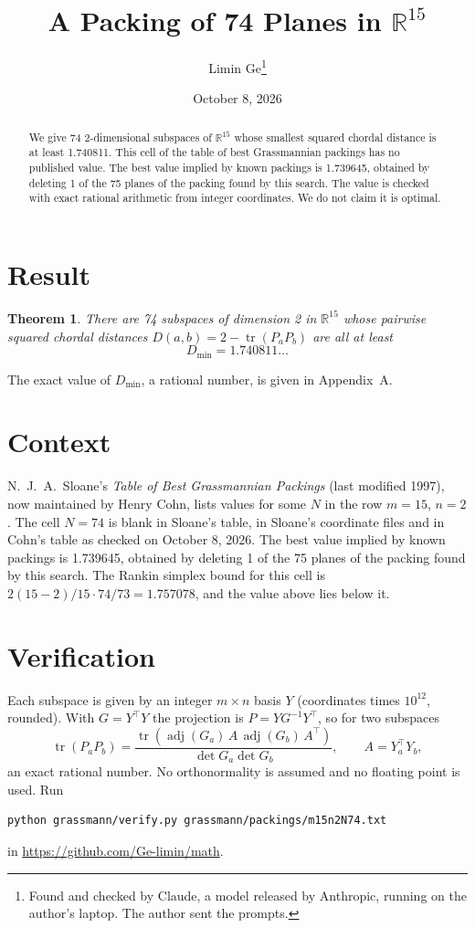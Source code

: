 \documentclass[11pt,a4paper]{article}
\title{A Packing of 74 Planes in $\mathbb{R}^{15}$}
\author{Limin Ge\thanks{Found and checked by Claude, a model released by Anthropic, running on the author's laptop. The author sent the prompts.}}
\date{October 8, 2026}
\newtheorem*{theorem}{Theorem}
\begin{document}
\maketitle
\begin{abstract}
We give 74 2-dimensional subspaces of $\mathbb{R}^{15}$ whose smallest squared chordal distance is at least 1.740811. This cell of the table of best Grassmannian packings has no published value. The best value implied by known packings is 1.739645, obtained by deleting 1 of the 75 planes of the packing found by this search. The value is checked with exact rational arithmetic from integer coordinates. We do not claim it is optimal.
\end{abstract}

\section{Result}
\begin{theorem}
There are 74 subspaces of dimension 2 in $\mathbb{R}^{15}$ whose pairwise squared chordal distances $D(a,b) = 2 - \operatorname{tr}(P_aP_b)$ are all at least
\[ D_{\min} = 1.740811\ldots \]
\end{theorem}
The exact value of $D_{\min}$, a rational number, is given in Appendix~A.


\section{Context}
N.~J.~A.~Sloane's \emph{Table of Best Grassmannian Packings} (last modified 1997), now maintained by Henry Cohn, lists values for some $N$ in the row $m=15$, $n=2$. The cell $N=74$ is blank in Sloane's table, in Sloane's coordinate files and in Cohn's table as checked on October 8, 2026. The best value implied by known packings is 1.739645, obtained by deleting 1 of the 75 planes of the packing found by this search. The Rankin simplex bound for this cell is $2(15-2)/15\cdot 74/73 = 1.757078$, and the value above lies below it.


\section{Verification}
Each subspace is given by an integer $m\times n$ basis $Y$ (coordinates times $10^{12}$, rounded). With $G=Y^\top Y$ the projection is $P=YG^{-1}Y^\top$, so for two subspaces
\[ \operatorname{tr}(P_aP_b)=\frac{\operatorname{tr}(\operatorname{adj}(G_a)\,A\,\operatorname{adj}(G_b)\,A^\top)}{\det G_a\det G_b},\qquad A=Y_a^\top Y_b, \]
an exact rational number. No orthonormality is assumed and no floating point is used. Run
\begin{verbatim}
python grassmann/verify.py grassmann/packings/m15n2N74.txt
\end{verbatim}
in \url{https://github.com/Ge-limin/math}.
\end{document}
